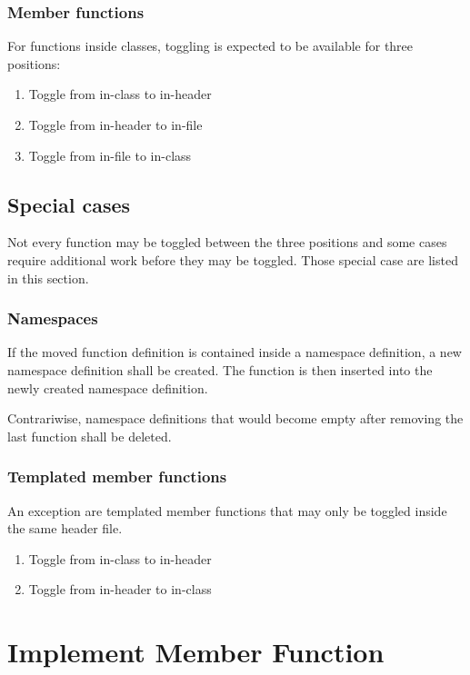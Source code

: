 \subsubsection{Member functions}
For functions inside classes, toggling is expected to be available for three 
positions:
\begin{enumerate}
\item Toggle from in-class to in-header
\item Toggle from in-header to in-file
\item Toggle from in-file to in-class
\end{enumerate}

\subsection{Special cases}

Not every function may be toggled between the three positions and some cases 
require additional work before they may be toggled. Those special case are 
listed in this section.

\subsubsection{Namespaces}

If the moved function definition is contained inside a namespace definition, a 
new namespace definition shall be created. The function is then inserted into 
the newly created namespace definition.

Contrariwise, namespace definitions that would become empty after removing the 
last function shall be deleted.


\subsubsection{Templated member functions}

An exception are templated member functions that may only be toggled inside the 
same header file.
\begin{enumerate}
\item Toggle from in-class to in-header
\item Toggle from in-header to in-class
\end{enumerate}


\section{Implement Member Function}

